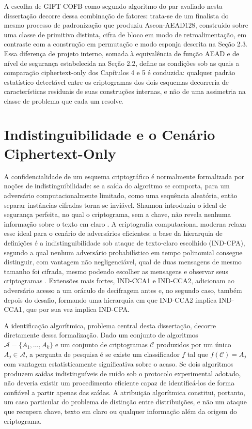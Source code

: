 A escolha de GIFT-COFB como segundo algoritmo do par avaliado nesta dissertação decorre dessa combinação de fatores: trata-se de um finalista do mesmo processo de padronização que produziu Ascon-AEAD128, construído sobre uma classe de primitivo distinta, cifra de bloco em modo de retroalimentação, em contraste com a construção em permutação e modo esponja descrita na Seção 2.3. Essa diferença de projeto interno, somada à equivalência de função AEAD e de nível de segurança estabelecida na Seção 2.2, define as condições sob as quais a comparação ciphertext-only dos Capítulos 4 e 5 é conduzida: qualquer padrão estatístico detectável entre os criptogramas dos dois esquemas decorreria de características residuais de suas construções internas, e não de uma assimetria na classe de problema que cada um resolve.



\section{Indistinguibilidade e o Cenário Ciphertext-Only}

A confidencialidade de um esquema criptográfico é normalmente formalizada por noções de indistinguibilidade: se a saída do algoritmo se comporta, para um adversário computacionalmente limitado, como uma sequência aleatória, então separar instâncias cifradas torna-se inviável. Shannon introduziu o ideal de segurança perfeita, no qual o criptograma, sem a chave, não revela nenhuma informação sobre o texto em claro \cite{shannon_1949}.
A criptografia computacional moderna relaxa esse ideal para o cenário de adversários eficientes: a base da hierarquia de definições é a indistinguibilidade sob ataque de texto-claro escolhido (IND-CPA), segundo a qual nenhum adversário probabilístico em tempo polinomial consegue distinguir, com vantagem não negligenciável, qual de duas mensagens de mesmo tamanho foi cifrada, mesmo podendo escolher as mensagens e observar seus criptogramas \cite{GoldwasserMicali1984PE}. Extensões mais fortes, IND-CCA1 e IND-CCA2, adicionam ao adversário acesso a um oráculo de decifragem antes e, no segundo caso, também depois do desafio, formando uma hierarquia em que IND-CCA2 implica IND-CCA1, que por sua vez implica IND-CPA.

A identificação algorítmica, problema central desta dissertação, decorre diretamente dessa formalização. Dado um conjunto de algoritmos $\mathcal{A} = \{A_1, \ldots, A_k\}$ e um conjunto de criptogramas $\mathcal{C}$ produzidos por um único $A_j \in \mathcal{A}$, a pergunta de pesquisa é se existe um classificador $f$ tal que $f(\mathcal{C}) = A_j$ com vantagem estatisticamente significativa sobre o acaso. Se dois algoritmos produzem saídas indistinguíveis de ruído sob o protocolo experimental adotado, não deveria existir um procedimento eficiente capaz de identificá-los de forma confiável a partir apenas das saídas. A atribuição algorítmica constitui, portanto, um caso particular do problema de distinção entre distribuições, e não um ataque que recupera chave, texto em claro ou qualquer informação além da origem do criptograma.

